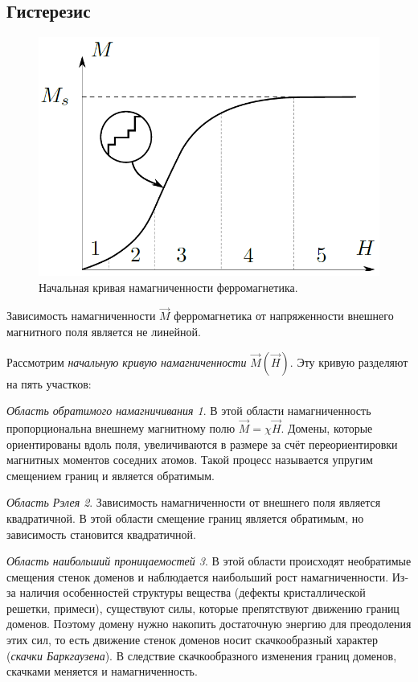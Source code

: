 \subsection*{Гистерезис}

\begin{figure}
	\vspace{-10pt}
	\centering
	\includegraphics[width=0.90\linewidth]{../res/magnetization curve.png}
	\caption{Начальная кривая намагниченности ферромагнетика.}
	\label{img:domen}
\end{figure}

Зависимость намагниченности $\vec{M}$ ферромагнетика от напряженности внешнего магнитного поля является не линейной.

Рассмотрим \textit{начальную кривую намагниченности} $\vec{M}(\vec{H})$. Эту кривую разделяют на пять участков:

\textit{Область обратимого намагничивания 1}. В этой области намагниченность пропорциональна внешнему магнитному полю $\vec{M} = \chi \vec{H}$. Домены, которые ориентированы вдоль поля, увеличиваются в размере за счёт переориентировки магнитных моментов соседних атомов. Такой процесс называется упругим смещением границ и является обратимым.

\textit{Область Рэлея 2}. Зависимость намагниченности от внешнего поля является квадратичной. В этой области смещение границ является обратимым, но зависимость становится квадратичной.

\textit{Область наибольший проницаемостей 3}. В этой области происходят необратимые смещения стенок доменов и наблюдается наибольший рост намагниченности. Из-за наличия особенностей структуры вещества (дефекты кристаллической решетки, примеси), существуют силы, которые препятствуют движению границ доменов. Поэтому домену нужно накопить достаточную энергию для преодоления этих сил, то есть движение стенок доменов носит скачкообразный характер (\textit{скачки Баркгаузена}). В следствие скачкообразного изменения границ доменов, скачками меняется и намагниченность.

